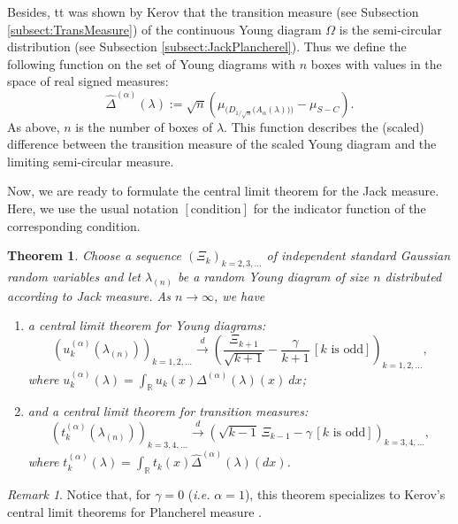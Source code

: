 \documentclass[11pt]{amsart}
\theoremstyle{plain}
\newtheorem{theorem}[lemma]{Theorem}
\theoremstyle{remark}
\newtheorem*{remark}{Remark}
\newcommand{\RR}{\mathbb{R}}
\begin{document}
Besides, tt was shown by Kerov \cite{Kerov1993} that the transition measure (see Subsection \ref{subsect:TransMeasure}) of the continuous Young diagram $\Omega$ is the semi-circular distribution (see Subsection \ref{subsect:JackPlancherel}).
Thus we define the following function on the set of Young diagrams with $n$ boxes with values in the space of real signed measures:
\[ \widehat{\Delta}^{(\alpha)}(\lambda) := \sqrt{n}\left( \mu_{\bigg(D_{1/\sqrt{n}}\big(A_\alpha(\lambda)\big)\bigg)} - \mu_{S-C} \right) .\]
As above, $n$ is the number of boxes of $\lambda$.
This function describes the (scaled) difference between the transition measure of the scaled Young diagram and the limiting semi-circular measure.

Now, we are ready to formulate the central limit theorem for the Jack measure.
Here, we use the usual notation $[\text{condition}]$ for the indicator function of the corresponding condition.
\begin{theorem}
\label{theo:Fluctuations}
Choose a sequence $\left(\Xi_k \right)_{k=2,3,\dots}$ of independent standard Gaussian random variables
and let $\lambda_{(n)}$ be a random Young diagram of size $n$ distributed according to Jack measure.
As $n \to \infty$, we have
\begin{enumerate}
\item
\label{item:fluctuationsOfDiagrams}
a central limit theorem for Young diagrams: 
\[ \left( u^{(\alpha)}_{k}(\lambda_{(n)}) \right)_{k=1,2,\dots} \xrightarrow{d} 
\left(  \frac{\Xi_{k+1}}{\sqrt{k+1}} - \frac{\gamma}{k+1} \, [k\text{ is odd}]\right)_{k=1,2,\dots}, \]
where $u^{(\alpha)}_{k} (\lambda) = \int_\RR u_k(x) \Delta^{(\alpha)}(\lambda)(x)\ dx$;\medskip
\item
\label{item:fluctuationsOfTransition}
and a central limit theorem for transition measures:
\[ \left( t^{(\alpha)}_{k}(\lambda_{(n)}) \right)_{k=3,4,\dots} \xrightarrow{d} \left(  \sqrt{k-1}\, \Xi_{k-1} - \gamma \, [k\text{ is odd}]  \right)_{k=3,4,\dots}, \]
where $t^{(\alpha)}_{k} (\lambda) = \int_\RR t_k(x) \widehat{\Delta}^{(\alpha)}(\lambda)(dx)$.
\end{enumerate}
\end{theorem}

\begin{remark}
    Notice that, for $\gamma=0$ ({\it i.e.} $\alpha=1$),
    this theorem specializes to Kerov's central limit theorems for Plancherel measure \cite{Kerov1993, IvanovOlshanski2002}.
\end{remark}
\end{document}
